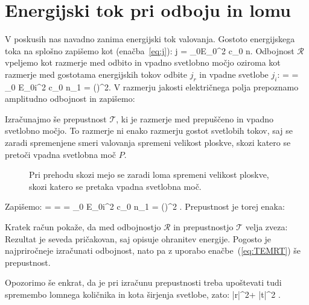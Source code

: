 \section{Energijski tok pri odboju in lomu}
V poskusih nas navadno zanima energijski tok valovanja. Gostoto energijskega
toka na splošno zapišemo kot (enačba~\ref{eq:j}):
\beq
j =  \varepsilon_0E_0^2 c_0 n.
\label{eq:04_44}
\eeq
Odbojnost $\mathcal{R}$ vpeljemo kot razmerje med odbito in vpadno svetlobno močjo oziroma
kot razmerje med gostotama energijskih
tokov odbite $j_r$ in vpadne svetlobe $j_i$:
\beq
{} =  = 
{\varepsilon_0 E_{0i}^2 c_0 n_1} = \left(\right)^2\!\!.
\label{eq:04_45}
\eeq
V razmerju jakosti električnega polja prepoznamo amplitudno odbojnost in zapišemo:

Izračunajmo še prepustnost $\mathcal{T}$, ki je razmerje med prepuščeno in vpadno svetlobno 
močjo. To razmerje ni enako razmerju gostot svetlobih tokov, saj se zaradi
spremenjene smeri valovanja spremeni velikost ploskve, skozi
katero se pretoči vpadna svetlobna moč $P$.
\begin{figure}[ht]
\centering
\def\svgwidth{60truemm} 

\caption{Pri prehodu skozi mejo se zaradi loma spremeni velikost
ploskve, skozi katero se pretaka vpadna svetlobna moč.}
\label{fig:04_coscos}
\end{figure}

Zapišemo: 
\beq
{} =  =  =
{\varepsilon_0 E_{0i}^2 c_0 n_1} \frac{\cos\beta}{\cos\alpha}= 
\left(\right)^2 .
\label{eq:04_46}
\eeq
Prepustnost je torej enaka:

Kratek  račun pokaže, da med odbojnostjo $\mathcal{R}$ in prepustnostjo $\mathcal{T}$ velja zveza:
Rezultat je seveda pričakovan, saj opisuje ohranitev energije. Pogosto je najpriročneje
izračunati odbojnost, nato pa z uporabo enačbe~(\ref{eq:TEMRT}) še prepustnost. 

Opozorimo še enkrat, da je pri izračunu prepustnosti treba upoštevati tudi 
spremembo lomnega količnika in kota širjenja svetlobe, zato:
\beq
|r|^2+ |t|^2 .
\label{eq:04_48}
\eeq

